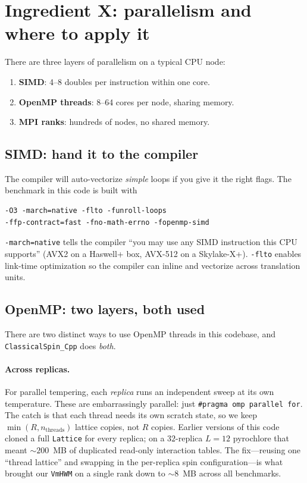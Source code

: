 \documentclass[11pt,letterpaper]{article}
\begin{document}
\section{Ingredient X: parallelism and where to apply it}

There are three layers of parallelism on a typical CPU node:
\begin{enumerate}[noitemsep]
  \item \textbf{SIMD}: 4--8 doubles per instruction within one core.
  \item \textbf{OpenMP threads}: 8--64 cores per node, sharing memory.
  \item \textbf{MPI ranks}: hundreds of nodes, no shared memory.
\end{enumerate}

\subsection{SIMD: hand it to the compiler}
The compiler will auto-vectorize \emph{simple} loops if you give it the
right flags.  The benchmark in this code is built with
\begin{lstlisting}
-O3 -march=native -flto -funroll-loops
-ffp-contract=fast -fno-math-errno -fopenmp-simd
\end{lstlisting}
\texttt{-march=native} tells the compiler ``you may use any SIMD
instruction this CPU supports'' (AVX2 on a Haswell+ box, AVX-512 on a
Skylake-X+).  \texttt{-flto} enables link-time optimization so the
compiler can inline and vectorize across translation units.

\subsection{OpenMP: two layers, both used}
\label{sec:openmp-layers}

There are two distinct ways to use OpenMP threads in this codebase, and
\texttt{ClassicalSpin\_Cpp} does \emph{both}.

\paragraph{Across replicas.}
For parallel tempering, each \emph{replica} runs an independent sweep at
its own temperature.  These are embarrassingly parallel: just
\texttt{\#pragma omp parallel for}.  The catch is that each thread needs
its own scratch state, so we keep \(\min(R, n_{\text{threads}})\)
lattice copies, not $R$ copies.  Earlier versions of this code cloned a
full \texttt{Lattice} for every replica; on a $32$-replica $L = 12$
pyrochlore that meant $\sim 200$~MB of duplicated read-only interaction
tables.  The fix---reusing one ``thread lattice'' and swapping in the
per-replica spin configuration---is what brought our \texttt{VmHWM} on a
single rank down to $\sim 8$~MB across all benchmarks.
\end{document}
